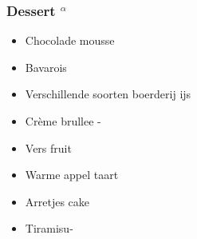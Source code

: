 \subsubsection*{Dessert $^{\alpha}$}
\begin{itemize}
	\item	Chocolade mousse
	\item	Bavarois
	\item	Verschillende soorten boerderij ijs
	\item	Crème brullee -
	\item	Vers fruit
	\item	Warme appel taart
	\item	Arretjes cake
	\item	Tiramisu-
\end{itemize}


